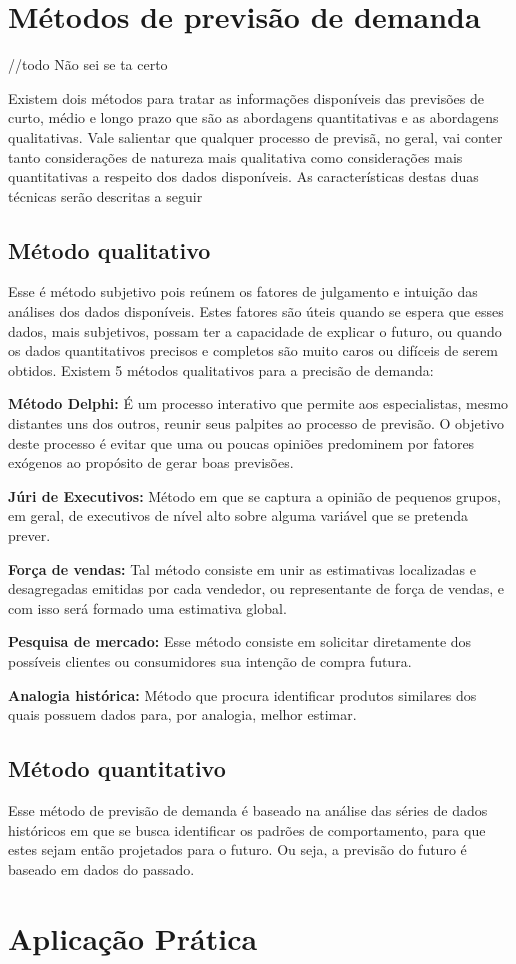 \section{Métodos de previsão de demanda}
//todo Não sei se ta certo

Existem dois métodos para tratar as informações disponíveis das previsões de curto, médio e longo prazo que são as abordagens quantitativas e as abordagens qualitativas. Vale salientar que qualquer processo de previsã, no geral, vai conter tanto considerações de natureza mais qualitativa como considerações mais quantitativas a respeito dos dados disponíveis. As características destas duas técnicas serão descritas a seguir 

\subsection{Método qualitativo}

Esse é método subjetivo pois reúnem os fatores de julgamento e intuição das análises dos dados disponíveis. Estes fatores são úteis quando se espera que esses dados, mais subjetivos, possam ter a capacidade de explicar o futuro, ou quando os dados quantitativos precisos e completos são muito caros ou difíceis de serem obtidos. Existem 5 métodos qualitativos para a precisão de demanda: 

\textbf{Método Delphi:} É um processo interativo que permite aos especialistas, mesmo distantes uns dos outros, reunir seus palpites ao processo de previsão. O objetivo deste processo é evitar que uma ou poucas opiniões predominem por fatores exógenos ao propósito de gerar boas previsões. 

\textbf{Júri de Executivos:} Método em que se captura a opinião de pequenos grupos, em geral, de executivos de nível alto sobre alguma variável que se pretenda prever.

\textbf{Força de vendas:} Tal método consiste em unir as estimativas localizadas e desagregadas emitidas por cada vendedor, ou representante de força de vendas, e com isso será formado uma estimativa global.

\textbf{Pesquisa de mercado:} Esse método consiste em solicitar diretamente dos possíveis clientes ou consumidores sua intenção de compra futura.

\textbf{Analogia histórica:} Método que procura identificar produtos similares dos quais possuem dados para, por analogia, melhor estimar.

\subsection{Método quantitativo}

Esse método de previsão de demanda é baseado na análise das séries de dados históricos em que se busca identificar os padrões de comportamento, para que estes sejam então projetados para o futuro. Ou seja, a previsão do futuro é baseado em dados do passado.

\section{Aplicação Prática} 
\label{sec:introducao_ao_planejamento_aplicacao}

